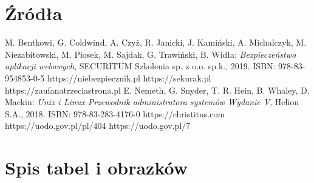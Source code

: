 \documentclass[12pt,a4paper]{article}
\begin{document}
	\section{Źródła}
		\begin{thebibliography}{99}
			 M. Bentkowi, G. Coldwind, A. Czyż, R. Janicki, J. Kamiński, A. Michalczyk, M. Niezabitowski, M. Piosek, M. Sajdak, G. Trawiński, B. Widła:
				\emph{Bezpieczeństwo aplikacji webowych},
				SECURITUM Szkolenia sp. z o.o. sp.k., 2019.
				ISBN: 978-83-954853-0-5
			 https://niebezpiecznik.pl
			 https://sekurak.pl
			 https://zaufanatrzeciastrona.pl
			 E. Nemeth, G. Snyder, T. R. Hein, B. Whaley, D. Mackin:
				\emph{Unix i Linux Przewodnik administratora systemów Wydanie V},
				Helion S.A., 2018.
				ISBN: 978-83-283-4176-0
			 https://christitus.com
			 https://uodo.gov.pl/pl/404
			 https://uodo.gov.pl/7
		\end{thebibliography}
	\newpage
	
	\section{Spis tabel i obrazków}
		\listoftables
		\listoffigures
\end{document}

